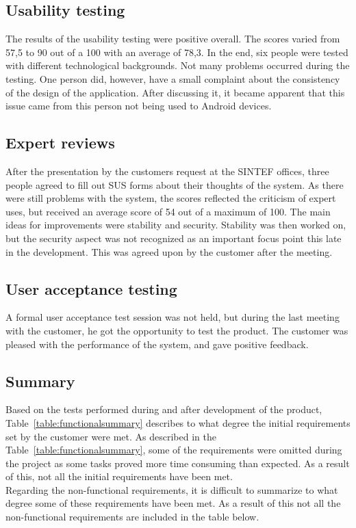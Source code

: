 		\subsection{Usability testing}
		The results of the usability testing were positive overall. The scores varied from 57,5 to 90 out of a 100 with an average of 78,3. In the end, six people were tested with different technological backgrounds. Not many problems  occurred during the testing. One person did, however, have a small complaint about the consistency of the design of the application. After discussing it, it became apparent that this issue came from this person not being used to Android devices. 

		\subsection{Expert reviews}
		After the presentation by the customers request at the SINTEF offices, three people agreed to fill out SUS forms about their thoughts of the system. As there were still problems with the system, the scores reflected the criticism of expert uses, but received an average score of 54 out of a maximum of 100. The main ideas for improvements were stability and security. Stability was then worked on, but the security aspect was not recognized as an important focus point this late in the development. This was agreed upon by the customer after the meeting.

		\subsection{User acceptance testing}
		A formal user acceptance test session was not held, but during the last meeting with the customer, he got the opportunity to test the product. The customer was pleased with the performance of the system, and gave positive feedback.

		\subsection{Summary}
		Based on the tests performed during and after development of the product, Table~\ref{table:functionalsummary} describes to what degree the initial requirements set by the customer were met. As described in the Table~\ref{table:functionalsummary}, some of the requirements were omitted during the project as some tasks proved more time consuming than expected. As a result of this, not all the initial requirements have been met. \\
		\newline
		Regarding the non-functional requirements, it is difficult to summarize to what degree some of these requirements have been met. As a result of this not all the non-functional requirements are included in the table below.


